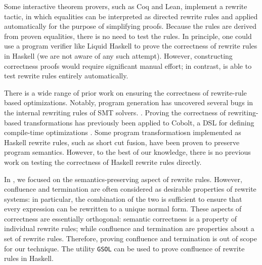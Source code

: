Some interactive theorem provers, such as Coq\cite{coq} and Lean\cite{lean},
implement a rewrite tactic, in which equalities can be interpreted as directed
rewrite rules and applied automatically for the purpose of simplifying proofs.
Because the rules are derived from proven equalities, there is no need to test
the rules. In principle, one could use a program verifier like Liquid
Haskell\cite{vazou2016liquid} to prove the correctness of rewrite rules in
Haskell (we are not aware of any such attempt). However, constructing
correctness proofs would require significant manual effort; in contrast,
\Rulecheck is able to test rewrite rules entirely automatically.

There is a wide range of prior work on ensuring the correctness of rewrite-rule
based optimizations. Notably, program generation has uncovered several bugs in
the internal rewriting rules of SMT solvers. \cite{winterer2020validating}.
Proving the correctness of rewriting-based transformations has previously been
applied to Cobolt, a DSL for defining compile-time optimizations
\cite{lerner2003automatically}. Some program transformatiosn implemented as
Haskell rewrite rules, such as short cut fusion\cite{shortcutfusion}, have been
proven to preserve program semantics\cite{johann2003short}. However, to the best
of our knowledge, there is no previous work on testing the correctness of
Haskell rewrite rules directly.

In \Rulecheck, we focused on the semantics-preserving aspect of rewrite rules.
However, confluence and termination are often considered as desirable properties
of rewrite systems: in particular, the combination of the two is sufficient to
ensure that every expression can be rewritten to a unique normal form. These
aspects of correctness are essentially orthogonal: semantic correctness is a
property of individual rewrite rules; while confluence and termination are
properties about a set of rewrite rules. Therefore, proving confluence and
termination is out of scope for our technique. The utility
\texttt{GSOL}\cite{hamana2022gsol} can be used to prove confluence of rewrite
rules in Haskell.
